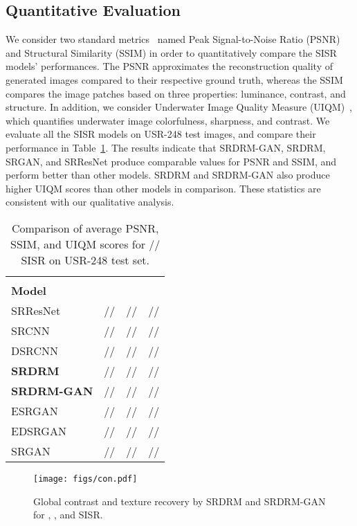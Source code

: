 \documentclass[10pt,twocolumn,letterpaper]{article}
\begin{document}
\subsection{Quantitative Evaluation}
We consider two standard metrics~\cite{hore2010image,islam2019fast} named Peak Signal-to-Noise Ratio (PSNR) and Structural Similarity (SSIM) in order to quantitatively compare the SISR models' performances. 
The PSNR approximates the reconstruction quality of generated images compared to their respective ground truth, whereas the SSIM~\cite{wang2004image} compares the image patches based on three properties: luminance, contrast, and structure.
In addition, we consider Underwater Image Quality Measure (UIQM)~\cite{panetta2016human}, which 
quantifies underwater image colorfulness, sharpness, and contrast.
We evaluate all the SISR models on USR-248 test images, and compare their performance in Table~\ref{tab:psnr_ssim}. 
The results indicate that SRDRM-GAN, SRDRM, SRGAN, and SRResNet produce comparable values for PSNR and SSIM, and perform better than other models. SRDRM and SRDRM-GAN also produce higher UIQM scores than other models in comparison. These statistics are consistent with our qualitative analysis. 


\begin{table}[t]
\centering
\caption{Comparison of average PSNR, SSIM, and UIQM scores for // SISR on USR-248 test set.}
\scriptsize
\vspace{-1mm}
\begin{tabular}{l|c|c|c}
  \hline
   &  &  &  \\
  \textbf{Model}    &  &  &  \\
  \hline \hline
  SRResNet & // & // & // \\ \hline
  SRCNN & // & // & // \\ \hline
  DSRCNN & // & // & // \\ \hline
  \textbf{SRDRM} & // & // & // \\ \hline
  \textbf{SRDRM-GAN} & // & // & // \\ \hline
  ESRGAN & // & // & // \\ \hline
  EDSRGAN & // & // & // \\ \hline
  SRGAN & // & // & // \\ \hline
\end{tabular}
\vspace{-1mm}
\label{tab:psnr_ssim}
\end{table}


\begin{figure}[t]
    \centering
    \texttt{[image: figs/con.pdf]}
    \vspace{-1mm}
    \caption{Global contrast and texture recovery by SRDRM and SRDRM-GAN for , , and  SISR.}
    \label{fig:con}
\end{figure}
\end{document}
